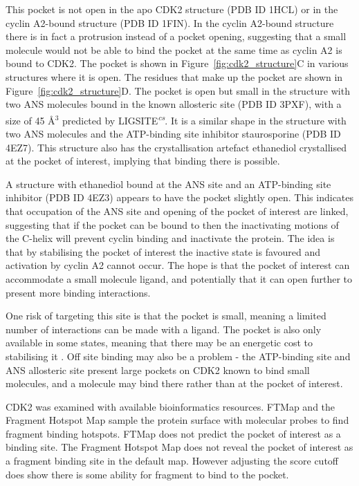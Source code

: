 This pocket is not open in the apo CDK2 structure (PDB ID 1HCL) or in the cyclin A2-bound structure (PDB ID 1FIN).
In the cyclin A2-bound structure there is in fact a protrusion instead of a pocket opening, suggesting that a small molecule would not be able to bind the pocket at the same time as cyclin A2 is bound to CDK2.
The pocket is shown in Figure~\ref{fig:cdk2_structure}C in various structures where it is open.
The residues that make up the pocket are shown in Figure~\ref{fig:cdk2_structure}D.
The pocket is open but small in the structure with two ANS molecules bound in the known allosteric site (PDB ID 3PXF), with a size of 45 \AA$^{3}$ predicted by LIGSITE\textsuperscript{\it cs}.
It is a similar shape in the structure with two ANS molecules and the ATP-binding site inhibitor staurosporine (PDB ID 4EZ7).
This structure also has the crystallisation artefact ethanediol crystallised at the pocket of interest, implying that binding there is possible.

A structure with ethanediol bound at the ANS site and an ATP-binding site inhibitor (PDB ID 4EZ3) appears to have the pocket slightly open.
This indicates that occupation of the ANS site and opening of the pocket of interest are linked, suggesting that if the pocket can be bound to then the inactivating motions of the \textalpha C-helix will prevent cyclin binding and inactivate the protein.
The idea is that by stabilising the pocket of interest the inactive state is favoured and activation by cyclin A2 cannot occur.
The hope is that the pocket of interest can accommodate a small molecule ligand, and potentially that it can open further to present more binding interactions.

One risk of targeting this site is that the pocket is small, meaning a limited number of interactions can be made with a ligand.
The pocket is also only available in some states, meaning that there may be an energetic cost to stabilising it \cite{Oleinikovas2016}.
Off site binding may also be a problem - the ATP-binding site and ANS allosteric site present large pockets on CDK2 known to bind small molecules, and a molecule may bind there rather than at the pocket of interest.

CDK2 was examined with available bioinformatics resources.
FTMap \cite{Kozakov2015} and the Fragment Hotspot Map \cite{Radoux2016} sample the protein surface with molecular probes to find fragment binding hotspots.
FTMap \cite{Kozakov2015} does not predict the pocket of interest as a binding site.
The Fragment Hotspot Map \cite{Radoux2016} does not reveal the pocket of interest as a fragment binding site in the default map.
However adjusting the score cutoff does show there is some ability for fragment to bind to the pocket.

